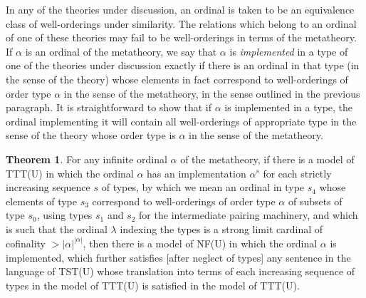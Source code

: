 \documentclass{article}
\theoremstyle{definition}
\newtheorem{theorem}{Theorem}[section]
\theoremstyle{remark}
\begin{document}
In any of the theories under discussion, an ordinal is taken to be an equivalence class of well-orderings under similarity.
The relations which belong to an ordinal of one of these theories may fail to be well-orderings in terms of the metatheory.
If $\alpha$ is an ordinal of the metatheory, we say that $\alpha$ is {\em implemented\/} in a type of one of the theories under discussion
exactly if there is an ordinal in that type (in the sense of the theory) whose elements in fact correspond to well-orderings of order type $\alpha$ in the sense of the metatheory, in the sense outlined in the previous paragraph.  It is straightforward to show that if $\alpha$ is implemented in a type, the ordinal implementing it will contain all well-orderings of appropriate type in the sense of the theory  whose order type is $\alpha$ in the sense of the metatheory.

\begin{theorem}

For any infinite ordinal $\alpha$ of the metatheory, if there is a model of TTT(U) in which the ordinal $\alpha$ has an implementation $\alpha^s$ for each strictly increasing sequence $s$ of types, by which we mean an ordinal in type $s_4$ whose elements of type $s_3$ correspond to well-orderings of order type $\alpha$ of subsets of type $s_0$, using types $s_1$ and $s_2$ for the intermediate pairing machinery, and which is such that the ordinal $\lambda$ indexing the types is a strong limit cardinal of cofinality $>|\alpha|^{|\alpha|}$, then there is a model of NF(U) in which the ordinal $\alpha$ is implemented, which further satisfies [after neglect of types] any sentence in the language of TST(U)  whose translation into terms of each increasing sequence of types in the model of TTT(U) is satisfied in the model of TTT(U).

\end{theorem}
\end{document}
